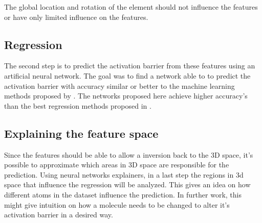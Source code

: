 The global location and rotation of the element should not influence the features or have only limited influence on the features.

\subsection{Regression}

The second step is to predict the activation barrier from these features using an artificial neural network.
The goal was to find a network able to to predict the activation barrier with accuracy similar or better to the machine learning methods proposed by \citeauthor{friederich_dos}.
The networks proposed here achieve higher accuracy's than the best regression methods proposed in \cite{friederich_dos}.


\subsection{Explaining the feature space}
Since the features should be able to allow a inversion back to the 3D space, it's possible to approximate which areas in 3D space are responsible for the prediction.
Using neural networks explainers, in  a last step the regions in 3d space that influence the regression will be analyzed.
This gives an idea on how different atoms in the dataset influence the prediction.
In further work, this might give intuition on how a molecule needs to be changed to alter it's activation barrier in a desired way.